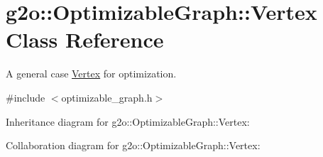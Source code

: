 \hypertarget{classg2o_1_1OptimizableGraph_1_1Vertex}{}\section{g2o\+:\+:Optimizable\+Graph\+:\+:Vertex Class Reference}
\label{classg2o_1_1OptimizableGraph_1_1Vertex}


A general case \hyperlink{classg2o_1_1OptimizableGraph_1_1Vertex}{Vertex} for optimization.  




{\ttfamily \#include $<$optimizable\+\_\+graph.\+h$>$}



Inheritance diagram for g2o\+:\+:Optimizable\+Graph\+:\+:Vertex\+:


Collaboration diagram for g2o\+:\+:Optimizable\+Graph\+:\+:Vertex\+:
